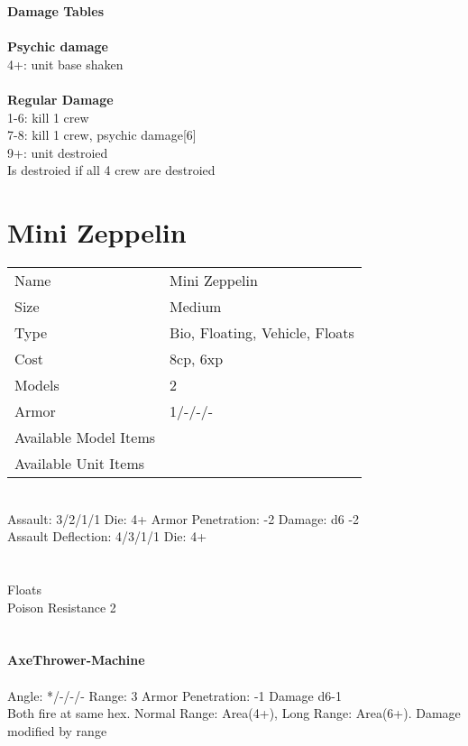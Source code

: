 {\bf Damage Tables} \\
\ \\ {\bf Psychic damage } \\
4+: unit base shaken \\
\ \\ {\bf Regular Damage } \\
1-6: kill 1 crew \\
7-8: kill 1 crew, psychic damage[6] \\
9+: unit destroied  \\
Is destroied if all 4 crew are destroied \\









\pagebreak

\section{ Mini Zeppelin }

\begin{tabular}{ll}
  Name & Mini Zeppelin \\
  Size & Medium\\
  Type & Bio, Floating, Vehicle, Floats\\
  Cost & 8cp, 6xp\\
  Models & 2\\
  Armor & 1/-/-/-\\
  Available Model Items &  \\
  Available Unit Items &  \\
\end{tabular}

\ \\
Assault: 3/2/1/1 Die: 4+ Armor Penetration: -2 Damage: d6 -2  \\
Assault Deflection: 4/3/1/1 Die: 4+\\
\indent  \\
\ \\
Floats\\ Poison Resistance 2 \\ 
\ \\
\ \\
{\bf AxeThrower-Machine } \\
\ \\
Angle: */-/-/- Range: 3 Armor Penetration: -1 Damage d6-1 \\
\indent Both fire at same hex. Normal Range: Area(4+), Long Range: Area(6+). Damage modified by range \\



